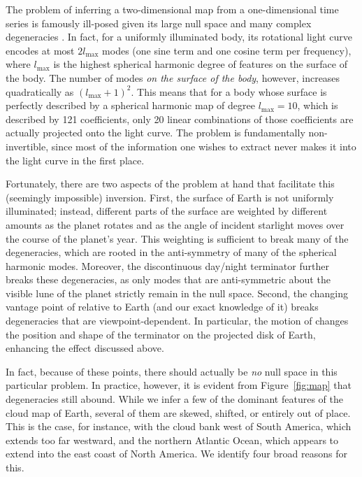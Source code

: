 \documentclass[modern]{aastex62}
\begin{document}
The problem of inferring a two-dimensional map from a one-dimensional
time series is famously ill-posed given its large null space and many complex
degeneracies \citep[e.g.,][]{CowanFuentesHaggard2013}. In fact, for a 
uniformly illuminated body, its rotational light curve encodes at most
$2l_\mathrm{max}$ modes (one sine term and one cosine term per frequency), 
where $l_\mathrm{max}$ is the highest spherical
harmonic degree of features on the surface of the body. The number of modes
\emph{on the surface of the body}, however, increases quadratically 
as $(l_\mathrm{max} + 1)^2$. This means that for a body whose surface is
perfectly described by a spherical harmonic map of degree $l_\mathrm{max} = 10$,
which is described by 121 coefficients, only 20 linear combinations
of those coefficients are actually projected onto the light curve. The
problem is fundamentally non-invertible, since most of the information
one wishes to extract never makes it into the light curve in the first place.

Fortunately, there are two aspects of the problem at hand that facilitate
this (seemingly impossible) inversion. First, the surface of Earth is
not uniformly illuminated; instead, different parts of the surface are weighted
by different amounts as the planet rotates and as the angle of incident starlight
moves over the course of the planet's year. This weighting is sufficient to break many
of the degeneracies, which are rooted in the anti-symmetry of many of the spherical
harmonic modes. Moreover, the discontinuous day/night terminator further
breaks these degeneracies, as only modes that are anti-symmetric about
the visible lune of the planet strictly remain in the null space. Second, 
the changing vantage point of \TESS relative to Earth (and our exact knowledge of it)
breaks degeneracies that are viewpoint-dependent. In particular, the motion of
\TESS changes the position and shape of the terminator on the projected disk
of Earth, enhancing the effect discussed above.

In fact, because of these points, there should actually be \emph{no} null space 
in this particular problem. In practice, however, it is evident from
Figure~\ref{fig:map} that degeneracies still abound. While we infer a few of the
dominant features of the cloud map of Earth, several of them are skewed, 
shifted, or entirely out of place. This is the case, for instance, with
the cloud bank west of South America, which extends too far westward, and
the northern Atlantic Ocean, which appears to extend into the east coast of
North America. We identify four broad reasons for this.
\end{document}
